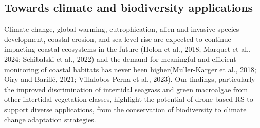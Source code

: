 \documentclass[
  letterpaper,
  11pt,
  english,
  singlespacing,
  headsepline]{MastersDoctoralThesis}
\begin{document}
\begin{spacing}{1.5}
\subsection{Towards climate and biodiversity
applications}\label{towards-climate-and-biodiversity-applications}

Climate change, global warming, eutrophication, alien and invasive
species development, coastal erosion, and sea level rise are expected to
continue impacting coastal ecosystems in the future (Holon et al., 2018;
Marquet et al., 2024; Schibalski et al., 2022) and the demand for
meaningful and efficient monitoring of coastal habitats has never been
higher(Muller-Karger et al., 2018; Oiry and Barillé, 2021; Villalobos
Perna et al., 2023). Our findings, particularly the improved
discrimination of intertidal seagrass and green macroalgae from other
intertidal vegetation classes, highlight the potential of drone-based RS
to support diverse applications, from the conservation of biodiversity
to climate change adaptation strategies.


\end{spacing}
\end{document}
